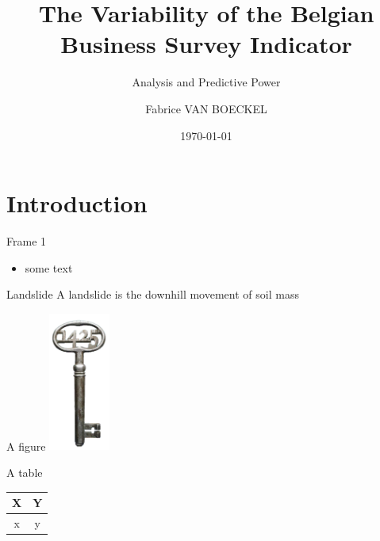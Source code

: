 \documentclass[]{beamer}
\title[The Variability of the Belgian Business Survey Indicator]{The Variability of the Belgian Business Survey Indicator}
\subtitle{Analysis and Predictive Power}
\author[F.\ Van Boeckel]{Fabrice VAN BOECKEL} %
\date{\today} %
\institute[KU Leuven]{Faculty of Science\\ Department of Mathematics\\ LSTAT}
\begin{document}
	{
		\maketitle
	}
	\addtocounter{framenumber}{-1} %

\section{Introduction}
\begin{frame}{Frame 1}
\begin{itemize}
    \item some text
    
\end{itemize}
\begin{kulblock}{Landslide}
    A landslide is the downhill movement of soil mass
\end{kulblock}
\end{frame}

\begin{frame}{A figure}
\centering
\includegraphics[width=2cm]{Images/sleutel.png}
\end{frame}

\begin{frame}{A table}
\centering
\begin{tabular}{|c|c|}
    \hline
     \bf X & \bf Y \\ \hline
     x & y \\ \hline 
\end{tabular}
\end{frame}
\end{document}
